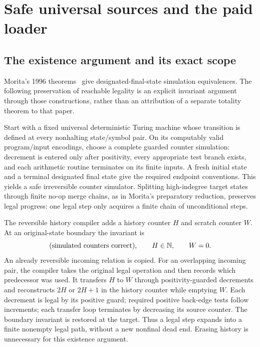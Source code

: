\documentclass[11pt,letterpaper]{article}
\numberwithin{equation}{section}
\theoremstyle{definition}
\theoremstyle{remark}
\newcommand{\NN}{\mathbb N}
\begin{document}
\section{Safe universal sources and the paid loader}\label{smc:sl:sec:safe}
\subsection{The existence argument and its exact scope}
Morita's 1996 theorems~\cite{morita1996} give designated-final-state simulation equivalences. The following preservation of reachable legality is an explicit invariant argument through those constructions, rather than an attribution of a separate totality theorem to that paper.

Start with a fixed universal deterministic Turing machine whose transition is defined at every nonhalting state/symbol pair. On its computably valid program/input encodings, choose a complete guarded counter simulation: decrement is entered only after positivity, every appropriate test branch exists, and each arithmetic routine terminates on its finite inputs. A fresh initial state and a terminal designated final state give the required endpoint conventions. This yields a safe irreversible counter simulator. Splitting high-indegree target states through finite no-op merge chains, as in Morita's preparatory reduction, preserves legal progress: one legal step only acquires a finite chain of unconditional steps.

The reversible history compiler adds a history counter $H$ and scratch counter $W$. At an original-state boundary the invariant is
\[
 (\hbox{simulated counters correct}),\qquad H\in\NN,\qquad W=0.
\]
An already reversible incoming relation is copied. For an overlapping incoming pair, the compiler takes the original legal operation and then records which predecessor was used. It transfers $H$ to $W$ through positivity-guarded decrements and reconstructs $2H$ or $2H+1$ in the history counter while emptying $W$. Each decrement is legal by its positive guard; required positive back-edge tests follow increments; each transfer loop terminates by decreasing its source counter. The boundary invariant is restored at the target. Thus a legal step expands into a finite nonempty legal path, without a new nonfinal dead end. Erasing history is unnecessary for this existence argument.
\end{document}
